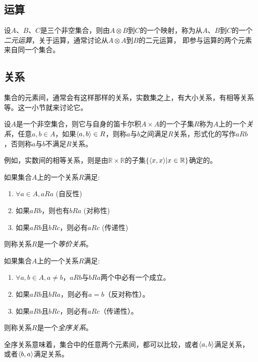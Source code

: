 \subsection{运算}
\label{sec:operation}

\begin{definition}
  设$A$、$B$、$C$是三个非空集合，则由$A \otimes B$到$C$的一个映射，称为从$A$、$B$到$C$的一个\emph{二元运算}，关于运算，通常讨论从$A \otimes A$到$B$的二元运算，
  即参与运算的两个元素来自同一个集合。
\end{definition}

\subsection{关系}
\label{sec:relation}

集合的元素间，通常会有这样那样的关系，实数集之上，有大小关系，有相等关系等。这一小节就来讨论它。

\begin{definition}
  设$A$是一个非空集合，则它与自身的笛卡尔积$A \times A$的一个子集$R$称为$A$上的一个\emph{关系}，任意$a,b \in A$，如果$\langle a, b \rangle \in R$，则称$a$与$b$之间满足$R$关系，形式化的写作$aRb$，否则称$a$与$b$不满足$R$关系。
\end{definition}

例如，实数间的相等关系，则是由$\mathbb{R} \times \mathbb{R}$的子集$\{\langle x, x \rangle | x \in \mathbb{R}\}$确定的。

\begin{definition}
  如果集合$A$上的一个关系$R$满足:
  \begin{enumerate}
  \item $\forall a \in A, aRa$ (自反性)
  \item 如果$aRb$，则也有$bRa$ (对称性)
  \item 如果$aRb$且$bRc$，则必有$aRc$ (传递性)
  \end{enumerate}
  则称关系$R$是一个\emph{等价关系}。
\end{definition}

\begin{definition}
  如果集合$A$上的一个关系$R$满足:
  \begin{enumerate}
  \item $\forall a,b \in A,a \neq b$，$aRb$与$bRa$两个中必有一个成立。
  \item 如果$aRb$且$bRa$，则必有$a=b$（反对称性）。
  \item 如果$aRb$且$bRc$，则必有$aRc$（传递性）。
  \end{enumerate}
  则称关系$R$是一个\emph{全序关系}。
\end{definition}
全序关系意味着，集合中的任意两个元素间，都可以比较，或者$\langle a, b \rangle$满足关系，或者$\langle b, a \rangle$满足关系。

